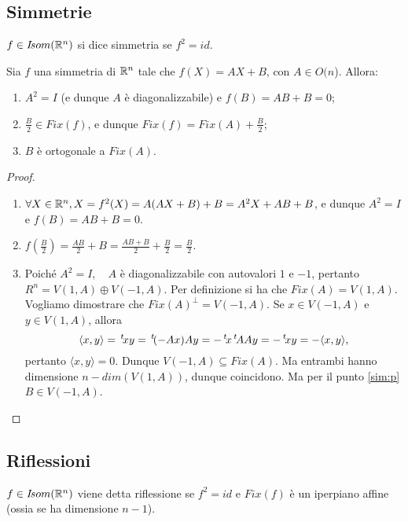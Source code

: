  
\subsection{Simmetrie}
 
 \begin{definition}
	$f\in I\!som( \mathbb R^n)$ si dice simmetria se $f^2=id$.
\end{definition}
 
 \begin{proposition}
 Sia $f$ una simmetria di $\mathbb R^n$ tale che $f(X)=AX+B$, con $A\in O(n$).
 Allora:
 \begin{enumerate}[label=\bf\Roman*)]
	\item $A^2=I$ (e dunque $A$ è diagonalizzabile) e $f(B)=AB+B=0$;\label{sim:p}
	\item $\frac{B}{2}\in Fix(f)$, e dunque $Fix(f)=Fix(A)+\frac{B}{2}$;
	\item $B$ è ortogonale a $Fix(A)$.
 \end{enumerate}
 \end{proposition}
 
 \begin{proof}
 \begin{enumerate}[label=\bf\Roman*)]
 \item $\forall X\in \mathbb R^n,  X=f^2(X)=A(AX+B)+B=A^2X+AB+B$, e dunque
 $A^2=I$ e $f(B)=AB+B=0$.
 \item $f(\frac{B}{2})=\frac{AB}{2}+B=\frac{AB+B}{2}+\frac{B}{2}=\frac{B}{2}$.
 \item Poiché $A^2=I,\quad A$ è diagonalizzabile con autovalori $1$ e $-1$, pertanto
 $R^n=V(1,A)\oplus V(-1,A)$. Per definizione si ha che $Fix(A)=V(1,A)$.
 Vogliamo dimostrare che $Fix(A)^{\bot}=V(-1,A)$.  Se $x\in V(-1,A)$ e $y\in V(1,A)$, allora 
  \[
   \langle x,y\rangle=\, ^{t}\!xy=\, ^{t}\!(-Ax)Ay=-\, ^{t}\!x\, ^{t}\!AAy=-\, ^{t}\!xy= -\langle x,y\rangle,
  \]
 pertanto $\langle x,y\rangle=0.$
 Dunque $V(-1,A)\subseteq Fix(A)$. Ma entrambi hanno dimensione
 $n-dim(V(1,A))$, dunque coincidono.
 Ma per il punto \ref{sim:p} $B\in V(-1,A)$.
 \end{enumerate}
 \end{proof}
 
	\subsection{Riflessioni}
 
 \begin{definition}
	$f\in I\!som( \mathbb R^n )$ viene detta riflessione se $f^2=id$ e $Fix(f)$ 
	è un iperpiano affine (ossia se ha dimensione $n-1$).
 \end{definition}

